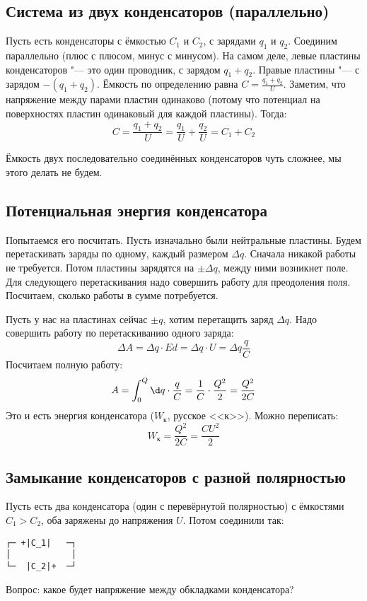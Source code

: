   \subsection{Система из двух конденсаторов (параллельно)}
    Пусть есть конденсаторы с ёмкостью $C_1$ и $C_2$, с зарядами $q_1$ и $q_2$.
    Соединим параллельно (плюс с плюсом, минус с минусом).
    На самом деле, левые пластины конденсаторов "--- это один проводник, с зарядом $q_1+q_2$.
    Правые пластины "--- с зарядом $-(q_1+q_2)$.
    Ёмкость по определению равна $C = \frac{q_1+q_2}{U}$.
    Заметим, что напряжение между парами пластин одинаково
    (потому что потенциал на поверхностях пластин одинаковый для каждой пластины).
    Тогда:
    \[ C = \frac{q_1 + q_2}{U} = \frac{q_1}{U} + \frac{q_2}{U} = C_1+C_2\]
    \begin{Rem}
    Ёмкость двух последовательно соединённых конденсаторов чуть сложнее, мы этого делать не будем.
    \end{Rem}

  \subsection{Потенциальная энергия конденсатора}
    Попытаемся его посчитать.
    Пусть изначально были нейтральные пластины.
    Будем перетаскивать заряды по одному, каждый размером $\Delta q$.
    Сначала никакой работы не требуется.
    Потом пластины зарядятся на $\pm \Delta q$, между ними возникнет поле.
    Для следующего перетаскивания надо совершить работу для преодоления поля.
    Посчитаем, сколько работы в сумме потребуется.

    Пусть у нас на пластинах сейчас $\pm q$, хотим перетащить заряд $\Delta q$.
    Надо совершить работу по перетаскиванию одного заряда:
    \[\Delta A=\Delta q \cdot E d = \Delta q \cdot U = \Delta q \frac q C\]
    Посчитаем полную работу:
    \[A = \int_0^Q \d q \cdot \frac q C = \frac 1C \cdot \frac{Q^2}{2} = \frac{Q^2}{2C}\]
    Это и есть энергия конденсатора ($W_к$, русское <<к>>).
    Можно переписать:
    \[W_к = \frac{Q^2}{2C} = \frac{CU^2}{2}\]

  \subsection{Замыкание конденсаторов с разной полярностью}
    Пусть есть два конденсатора (один с перевёрнутой полярностью) с ёмкостями $C_1 > C_2$, оба заряжены до напряжения $U$.
    Потом соединили так:
\begin{verbatim}
┌─ +|C_1|   ─┐
│            │
└─  |C_2|+  ─┘
\end{verbatim}
    Вопрос: какое будет напряжение между обкладками конденсатора?

